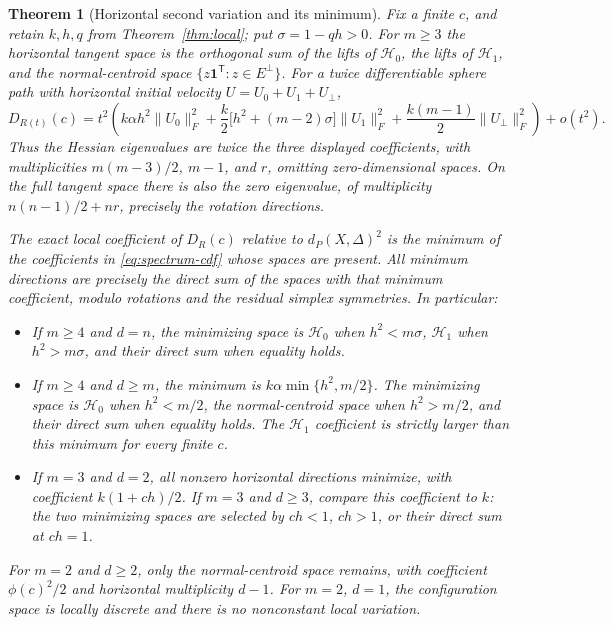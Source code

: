 \documentclass[11pt]{article}
\newtheorem{theorem}{Theorem}
\theoremstyle{remark}\newtheorem{remark}[theorem]{Remark}
\newcommand{\one}{\mathbf 1}
\begin{document}
\begin{theorem}[Horizontal second variation and its minimum]\label{thm:spectrum}
Fix a finite $c$, and retain $k,h,q$ from Theorem~\ref{thm:local}; put
$\sigma=1-qh>0$.  For $m\ge3$ the horizontal tangent space is the orthogonal
sum of the lifts of $\mathcal H_0$, the lifts of $\mathcal H_1$, and the
normal-centroid space $\{z\one^{\mathsf T}:z\in E^\perp\}$.
For a twice differentiable sphere path with horizontal initial velocity
$U=U_0+U_1+U_\perp$,
\begin{equation}\label{eq:spectrum-cdf}
 D_{R(t)}(c)=t^2\left(
 k\alpha h^2\|U_0\|_F^2+
 \frac{k}{2}\bigl[h^2+(m-2)\sigma\bigr]\|U_1\|_F^2+
 \frac{k(m-1)}2\|U_\perp\|_F^2\right)+o(t^2).
\end{equation}
Thus the Hessian eigenvalues are twice the three displayed coefficients,
with multiplicities $m(m-3)/2$, $m-1$, and $r$, omitting zero-dimensional
spaces.  On the full tangent space there is also the zero eigenvalue, of
multiplicity $n(n-1)/2+nr$, precisely the rotation directions.

The exact local coefficient of $D_R(c)$ relative to $d_P(X,\Delta)^2$ is
the minimum of the coefficients in \eqref{eq:spectrum-cdf} whose spaces
are present.  All minimum directions are precisely the direct sum of the
spaces with that minimum coefficient, modulo rotations and the residual
simplex symmetries.  In particular:
\begin{itemize}
\item If $m\ge4$ and $d=n$, the minimizing space is $\mathcal H_0$ when
$h^2<m\sigma$, $\mathcal H_1$ when $h^2>m\sigma$, and their direct sum
when equality holds.
\item If $m\ge4$ and $d\ge m$, the minimum is
$k\alpha\min\{h^2,m/2\}$.  The minimizing space is $\mathcal H_0$ when
$h^2<m/2$, the normal-centroid space when $h^2>m/2$, and their direct sum
when equality holds.  The $\mathcal H_1$ coefficient is strictly larger
than this minimum for every finite $c$.
\item If $m=3$ and $d=2$, all nonzero horizontal directions minimize,
with coefficient $k(1+ch)/2$.  If $m=3$ and $d\ge3$, compare this
coefficient to $k$: the two minimizing spaces are selected by $ch<1$,
$ch>1$, or their direct sum at $ch=1$.
\end{itemize}
For $m=2$ and $d\ge2$, only the normal-centroid space remains, with
coefficient $\phi(c)^2/2$ and horizontal multiplicity $d-1$.  For $m=2$,
$d=1$, the configuration space is locally discrete and there is no
nonconstant local variation.
\end{theorem}
\end{document}
